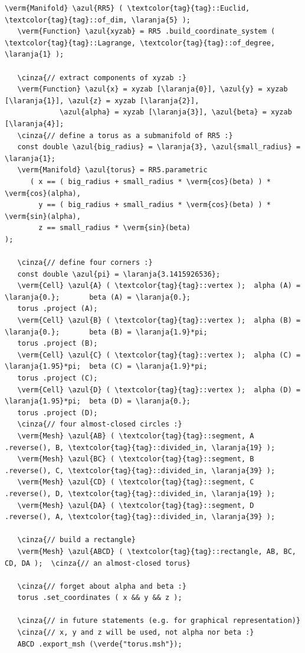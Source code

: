 \begin{Verbatim}[commandchars=\\\{\},formatcom=\small\tt,frame=single,
   label=parag-\ref{\numb section 2.\numb parag 17}.cpp,rulecolor=\color{coment},
   baselinestretch=0.94,framesep=2mm]
   \verm{Manifold} \azul{RR5} ( \textcolor{tag}{tag}::Euclid, \textcolor{tag}{tag}::of_dim, \laranja{5} );
   \verm{Function} \azul{xyzab} = RR5 .build_coordinate_system ( \textcolor{tag}{tag}::Lagrange, \textcolor{tag}{tag}::of_degree, \laranja{1} );

   \cinza{// extract components of xyzab :}
   \verm{Function} \azul{x} = xyzab [\laranja{0}], \azul{y} = xyzab [\laranja{1}], \azul{z} = xyzab [\laranja{2}],
             \azul{alpha} = xyzab [\laranja{3}], \azul{beta} = xyzab [\laranja{4}];
   \cinza{// define a torus as a submanifold of RR5 :}
   const double \azul{big_radius} = \laranja{3}, \azul{small_radius} = \laranja{1};
   \verm{Manifold} \azul{torus} = RR5.parametric
      ( x == ( big_radius + small_radius * \verm{cos}(beta) ) * \verm{cos}(alpha),
        y == ( big_radius + small_radius * \verm{cos}(beta) ) * \verm{sin}(alpha),
        z == small_radius * \verm{sin}(beta)                                );
        
   \cinza{// define four corners :}
   const double \azul{pi} = \laranja{3.1415926536};
   \verm{Cell} \azul{A} ( \textcolor{tag}{tag}::vertex );  alpha (A) = \laranja{0.};       beta (A) = \laranja{0.};
   torus .project (A);
   \verm{Cell} \azul{B} ( \textcolor{tag}{tag}::vertex );  alpha (B) = \laranja{0.};       beta (B) = \laranja{1.9}*pi;
   torus .project (B);
   \verm{Cell} \azul{C} ( \textcolor{tag}{tag}::vertex );  alpha (C) = \laranja{1.95}*pi;  beta (C) = \laranja{1.9}*pi;
   torus .project (C);
   \verm{Cell} \azul{D} ( \textcolor{tag}{tag}::vertex );  alpha (D) = \laranja{1.95}*pi;  beta (D) = \laranja{0.};
   torus .project (D);
   \cinza{// four almost-closed circles :}
   \verm{Mesh} \azul{AB} ( \textcolor{tag}{tag}::segment, A .reverse(), B, \textcolor{tag}{tag}::divided_in, \laranja{19} );
   \verm{Mesh} \azul{BC} ( \textcolor{tag}{tag}::segment, B .reverse(), C, \textcolor{tag}{tag}::divided_in, \laranja{39} );
   \verm{Mesh} \azul{CD} ( \textcolor{tag}{tag}::segment, C .reverse(), D, \textcolor{tag}{tag}::divided_in, \laranja{19} );
   \verm{Mesh} \azul{DA} ( \textcolor{tag}{tag}::segment, D .reverse(), A, \textcolor{tag}{tag}::divided_in, \laranja{39} );

   \cinza{// build a rectangle}
   \verm{Mesh} \azul{ABCD} ( \textcolor{tag}{tag}::rectangle, AB, BC, CD, DA );  \cinza{// an almost-closed torus}

   \cinza{// forget about alpha and beta :}
   torus .set_coordinates ( x && y && z );

   \cinza{// in future statements (e.g. for graphical representation)}
   \cinza{// x, y and z will be used, not alpha nor beta :}
   ABCD .export_msh (\verde{"torus.msh"});
\end{Verbatim}

